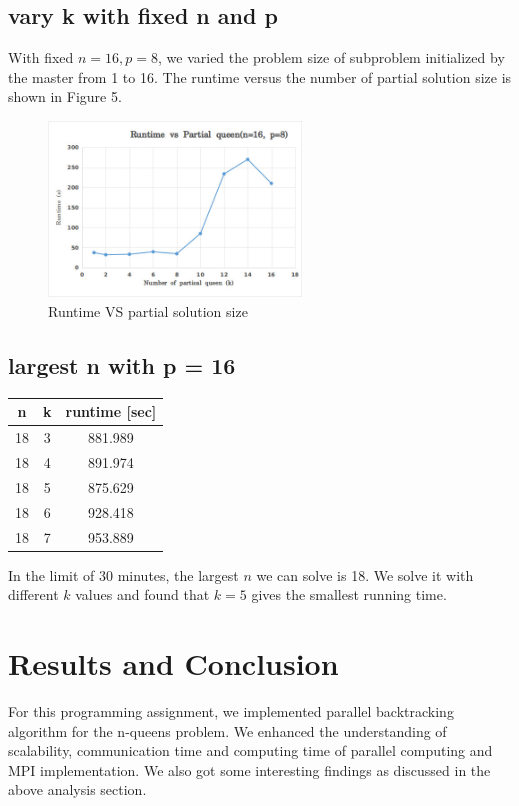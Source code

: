 \documentclass[twoside,12pt]{article}
\begin{document}
\subsection{vary k with fixed n and p}
    With fixed $ n = 16, p = 8 $, we varied the problem size of subproblem initialized by the master from 1 to 16. The runtime versus the number of partial solution size is shown in Figure 5.
	\begin{figure}[H]
	\centering
	\includegraphics[width=0.6\textwidth]{runVSk}
	\caption{Runtime VS partial solution size}
    \end{figure}

\subsection{largest n with  p = 16 }
\begin{center}
	\begin{tabular}{ |c| c |c|}
		\hline
		n & k & runtime [sec] \\
		\hline
		18 & 3 & 881.989 \\
		\hline
		18 & 4 & 891.974 \\
		\hline
		18 & 5 & 875.629 \\
		\hline
		18 & 6 & 928.418 \\
		\hline
		18 & 7 & 953.889 \\
		\hline
		
	\end{tabular}	
\end{center}
In the limit of 30 minutes, the largest $ n $ we can solve is 18. We solve it with different $ k $ values and found that $ k = 5 $ gives the smallest running time.

\section{Results and Conclusion}
For this programming assignment, we implemented parallel backtracking algorithm for the n-queens problem. We enhanced the understanding of scalability, communication time and computing time of parallel computing and MPI implementation. We also got some interesting findings as discussed in the above analysis section. 

     
\end{document}
